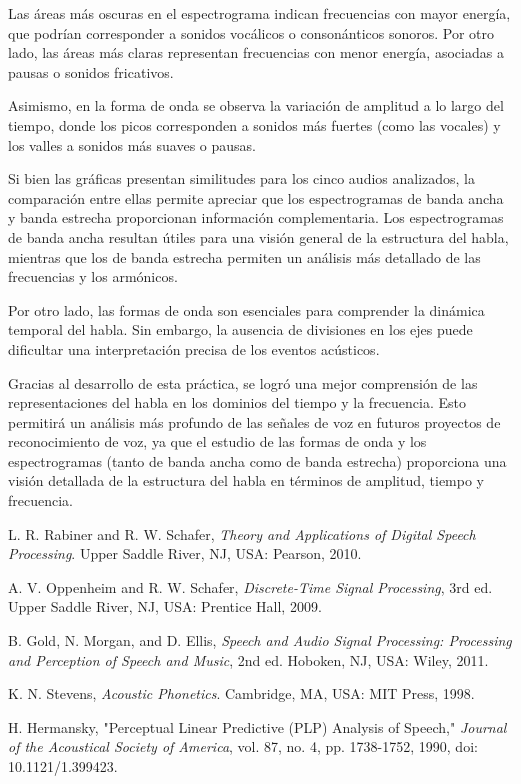 \documentclass{report}
\begin{document}
Las áreas más oscuras en el espectrograma indican frecuencias con mayor energía, que podrían corresponder a sonidos vocálicos o consonánticos sonoros. Por otro lado, las áreas más claras representan frecuencias con menor energía, asociadas a pausas o sonidos fricativos.  

Asimismo, en la forma de onda se observa la variación de amplitud a lo largo del tiempo, donde los picos corresponden a sonidos más fuertes (como las vocales) y los valles a sonidos más suaves o pausas.  

Si bien las gráficas presentan similitudes para los cinco audios analizados, la comparación entre ellas permite apreciar que los espectrogramas de banda ancha y banda estrecha proporcionan información complementaria. Los espectrogramas de banda ancha resultan útiles para una visión general de la estructura del habla, mientras que los de banda estrecha permiten un análisis más detallado de las frecuencias y los armónicos.  

Por otro lado, las formas de onda son esenciales para comprender la dinámica temporal del habla. Sin embargo, la ausencia de divisiones en los ejes puede dificultar una interpretación precisa de los eventos acústicos.  

Gracias al desarrollo de esta práctica, se logró una mejor comprensión de las representaciones del habla en los dominios del tiempo y la frecuencia. Esto permitirá un análisis más profundo de las señales de voz en futuros proyectos de reconocimiento de voz, ya que el estudio de las formas de onda y los espectrogramas (tanto de banda ancha como de banda estrecha) proporciona una visión detallada de la estructura del habla en términos de amplitud, tiempo y frecuencia.

\newpage
\begin{thebibliography}{00}

     L. R. Rabiner and R. W. Schafer, \textit{Theory and Applications of Digital Speech Processing}. Upper Saddle River, NJ, USA: Pearson, 2010.
    
     A. V. Oppenheim and R. W. Schafer, \textit{Discrete-Time Signal Processing}, 3rd ed. Upper Saddle River, NJ, USA: Prentice Hall, 2009.
    
     B. Gold, N. Morgan, and D. Ellis, \textit{Speech and Audio Signal Processing: Processing and Perception of Speech and Music}, 2nd ed. Hoboken, NJ, USA: Wiley, 2011.
    
     K. N. Stevens, \textit{Acoustic Phonetics}. Cambridge, MA, USA: MIT Press, 1998.
    
     H. Hermansky, "Perceptual Linear Predictive (PLP) Analysis of Speech," \textit{Journal of the Acoustical Society of America}, vol. 87, no. 4, pp. 1738-1752, 1990, doi: 10.1121/1.399423.
    
    \end{thebibliography}
    
\end{document}
